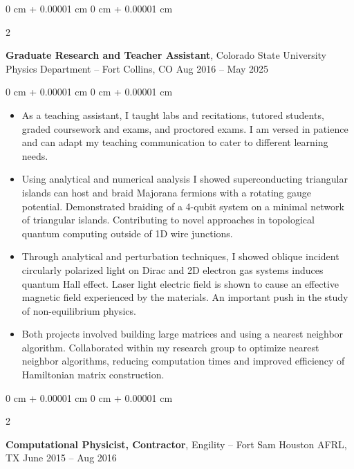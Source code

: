 \documentclass[10pt, letterpaper]{article}
\newenvironment{highlights}{
    \begin{itemize}[
        topsep=0.10 cm,
        parsep=0.10 cm,
        partopsep=0pt,
        itemsep=0pt,
        leftmargin=0 cm + 10pt
    ]
}{
    \end{itemize}
} %
\newenvironment{onecolentry}{
    \begin{adjustwidth}{
        0 cm + 0.00001 cm
    }{
        0 cm + 0.00001 cm
    }
}{
    \end{adjustwidth}
} %
\newenvironment{twocolentry}[2][]{
    \onecolentry
    \def\secondColumn{#2}
    \setcolumnwidth{\fill, 4.5 cm}
    \begin{paracol}{2}
}{
    \switchcolumn \raggedleft \secondColumn
    \end{paracol}
    \endonecolentry
} %
\begin{document}
        \begin{twocolentry}{
            Aug 2016 – May 2025
        }
            \textbf{Graduate Research and Teacher Assistant}, Colorado State University Physics Department -- Fort Collins, CO\end{twocolentry}

        \vspace{0.10 cm}
        \begin{onecolentry}
            \begin{highlights}
            \item As a teaching assistant, I taught labs and recitations, tutored students, graded coursework and exams, and proctored exams. I am versed in patience and can adapt my teaching communication to cater to different learning needs.
            \item Using analytical and numerical analysis I showed superconducting triangular islands can host and braid Majorana fermions with a rotating gauge potential. Demonstrated braiding of a 4-qubit system on a minimal network of triangular islands. Contributing to novel approaches in topological quantum computing outside of 1D wire junctions.
            \item Through analytical and perturbation techniques, I showed oblique incident circularly polarized light on Dirac and 2D electron gas systems induces quantum Hall effect. Laser light electric field is shown to cause an effective magnetic field experienced by the materials. An important push in the study of non-equilibrium physics.
            \item Both projects involved building large matrices and using a nearest neighbor algorithm. Collaborated within my research group to optimize nearest neighbor algorithms, reducing computation times and improved efficiency of Hamiltonian matrix construction.
            \end{highlights}
        \end{onecolentry}

        \vspace{0.2 cm}

        \begin{twocolentry}{
            June 2015 – Aug 2016
        }
      \textbf{Computational Physicist, Contractor}, Engility -- Fort Sam Houston AFRL, TX\end{twocolentry}
\end{document}
